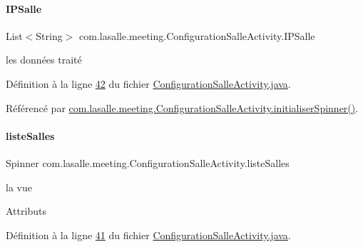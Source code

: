 \paragraph{\texorpdfstring{I\+P\+Salle}{IPSalle}}
{\footnotesize\ttfamily List$<$String$>$ com.\+lasalle.\+meeting.\+Configuration\+Salle\+Activity.\+I\+P\+Salle\hspace{0.3cm}{\ttfamily [private]}}



les données traité 



Définition à la ligne \hyperlink{_configuration_salle_activity_8java_source_l00042}{42} du fichier \hyperlink{_configuration_salle_activity_8java_source}{Configuration\+Salle\+Activity.\+java}.



Référencé par \hyperlink{_configuration_salle_activity_8java_source_l00100}{com.\+lasalle.\+meeting.\+Configuration\+Salle\+Activity.\+initialiser\+Spinner()}.

\mbox{\label{classcom_1_1lasalle_1_1meeting_1_1_configuration_salle_activity_ac1fa67c33882d1f181ba80a061ad097a}} 
\paragraph{\texorpdfstring{liste\+Salles}{listeSalles}}
{\footnotesize\ttfamily Spinner com.\+lasalle.\+meeting.\+Configuration\+Salle\+Activity.\+liste\+Salles\hspace{0.3cm}{\ttfamily [private]}}



la vue 

Attributs 

Définition à la ligne \hyperlink{_configuration_salle_activity_8java_source_l00041}{41} du fichier \hyperlink{_configuration_salle_activity_8java_source}{Configuration\+Salle\+Activity.\+java}.

\mbox{\label{classcom_1_1lasalle_1_1meeting_1_1_configuration_salle_activity_ae7ae98c2c6e8e8d42260100ecc70aabc}} 
